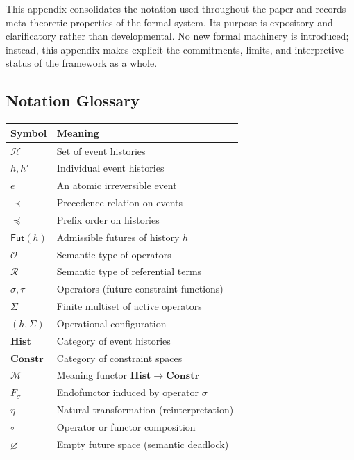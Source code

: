 \documentclass[11pt]{article}
\begin{document}
This appendix consolidates the notation used throughout the paper and records
meta-theoretic properties of the formal system. Its purpose is expository and
clarificatory rather than developmental. No new formal machinery is introduced;
instead, this appendix makes explicit the commitments, limits, and interpretive
status of the framework as a whole.

\subsection{Notation Glossary}

\begin{center}
\begin{tabular}{ll}
\textbf{Symbol} & \textbf{Meaning} \\
\midrule
$\mathcal{H}$ & Set of event histories \\
$h, h'$ & Individual event histories \\
$e$ & An atomic irreversible event \\
$\prec$ & Precedence relation on events \\
$\preceq$ & Prefix order on histories \\
$\mathsf{Fut}(h)$ & Admissible futures of history $h$ \\
$\mathcal{O}$ & Semantic type of operators \\
$\mathcal{R}$ & Semantic type of referential terms \\
$\sigma, \tau$ & Operators (future-constraint functions) \\
$\Sigma$ & Finite multiset of active operators \\
$(h,\Sigma)$ & Operational configuration \\
$\mathbf{Hist}$ & Category of event histories \\
$\mathbf{Constr}$ & Category of constraint spaces \\
$\mathcal{M}$ & Meaning functor $\mathbf{Hist} \to \mathbf{Constr}$ \\
$F_\sigma$ & Endofunctor induced by operator $\sigma$ \\
$\eta$ & Natural transformation (reinterpretation) \\
$\circ$ & Operator or functor composition \\
$\varnothing$ & Empty future space (semantic deadlock)
\end{tabular}
\end{center}
\end{document}
